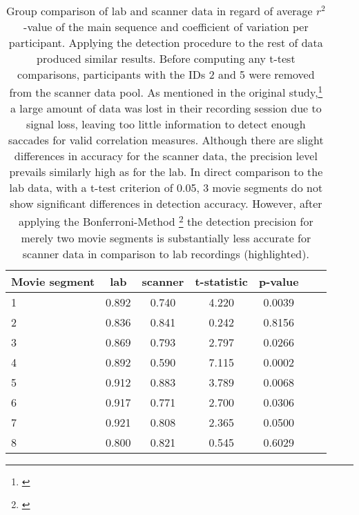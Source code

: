 \documentclass[10pt,a4paper,twocolumn]{article}
\begin{document}
\begin{table}[h]

\centering
\begin{tabular}{lcccccc}
\toprule
Movie segment & lab  & scanner & t-statistic & p-value \\
\midrule
\rowcolor{lightgray}
1 	&	0.892 	&	0.740	& 	4.220	& 	0.0039	\\

2	&   0.836 	&   0.841 	& 	0.242	& 	0.8156	\\

3 	&   0.869 	& 	0.793	& 	2.797 	& 	0.0266	\\
\rowcolor{lightgray}
4 	&   0.892 	& 	0.590 	& 	7.115 	& 	0.0002	\\

5 	&   0.912 	& 	0.883 	& 	3.789 	& 	0.0068	\\

6 	&   0.917 	& 	0.771 	& 	2.700	& 	0.0306	\\

7 	&   0.921 	& 	0.808 	& 	2.365 	& 	0.0500	\\

8 	&   0.800 	& 	0.821 	& 	0.545	& 	0.6029	\\
\bottomrule



\end{tabular}
\caption[]{Group comparison of lab and scanner data in regard of average $r^2$-value of the main sequence and coefficient of variation per participant. Applying the detection procedure to the rest of data produced similar results. Before computing any t-test comparisons, participants with the IDs 2 and 5 were removed from the scanner data pool. As mentioned in the original study,\footnote{\cite{Hanke.2016}} a large amount of data was lost in their recording session due to signal loss, leaving too little information to detect enough saccades for valid correlation measures. Although there are slight differences in accuracy for the scanner data, the precision level prevails similarly high as for the lab. In direct comparison to the lab data, with a t-test criterion of 0.05, 3 movie segments do not show significant differences in detection accuracy. However, after applying the Bonferroni-Method \footnote{\cite{Abdi.2007}} the detection precision for merely two movie segments is substantially less accurate for scanner data in comparison to lab recordings (highlighted).}
\label{groupcompare}
\end{table}
\twocolumn
\end{document}
